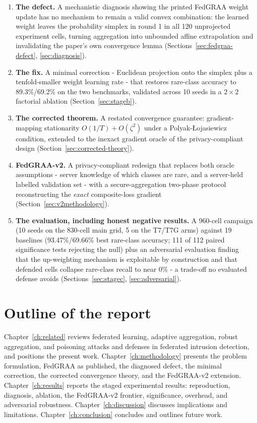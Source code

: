 \documentclass[11pt,a4paper]{report}
\begin{document}
\begin{enumerate}
\item \textbf{The defect.} A mechanistic diagnosis showing the printed
FedGRAA weight update has no mechanism to remain a valid convex combination:
the learned weight leaves the probability simplex in round 1 in all 120
unprojected experiment cells, turning aggregation into unbounded affine
extrapolation and invalidating the paper's own convergence lemma
(Sections~\ref{sec:fedgraa-defect}, \ref{sec:diagnosis}).
\item \textbf{The fix.} A minimal correction - Euclidean projection onto the
simplex plus a tenfold-smaller weight learning rate - that restores
rare-class accuracy to 89.3\%/69.2\% on the two benchmarks, validated across
10 seeds in a $2\times2$ factorial ablation (Section~\ref{sec:stageb}).
\item \textbf{The corrected theorem.} A restated convergence guarantee:
gradient-mapping stationarity $O(1/T)+O(\zeta^2)$ under a
Polyak-{\L}ojasiewicz condition, extended to the inexact gradient oracle of
the privacy-compliant design (Section~\ref{sec:corrected-theory}).
\item \textbf{FedGRAA-v2.} A privacy-compliant redesign that replaces both
oracle assumptions - server knowledge of which classes are rare, and a
server-held labelled validation set - with a secure-aggregation two-phase
protocol reconstructing the \emph{exact} composite-loss gradient
(Section~\ref{sec:v2methodology}).
\item \textbf{The evaluation, including honest negative results.} A 960-cell
campaign (10 seeds on the 830-cell main grid, 5 on the T7/T7G arms) against
19 baselines (93.47\%/69.66\% best rare-class accuracy; 111 of 112 paired
significance tests rejecting the null) plus an
adversarial evaluation finding that the up-weighting mechanism is exploitable
by construction and that defended cells collapse rare-class recall to near
0\% - a trade-off no evaluated defense avoids (Sections~\ref{sec:stagec},
\ref{sec:adversarial}).
\end{enumerate}

\section{Outline of the report}
\label{sec:outline}

Chapter~\ref{ch:related} reviews federated learning, adaptive aggregation,
robust aggregation, and poisoning attacks and defenses in federated intrusion
detection, and positions the present work. Chapter~\ref{ch:methodology}
presents the problem formulation, FedGRAA as published, the diagnosed defect,
the minimal correction, the corrected convergence theory, and the FedGRAA-v2
extension. Chapter~\ref{ch:results} reports the staged experimental results:
reproduction, diagnosis, ablation, the FedGRAA-v2 frontier, significance,
overhead, and adversarial robustness. Chapter~\ref{ch:discussion} discusses
implications and limitations. Chapter~\ref{ch:conclusion} concludes and
outlines future work.
\end{document}
